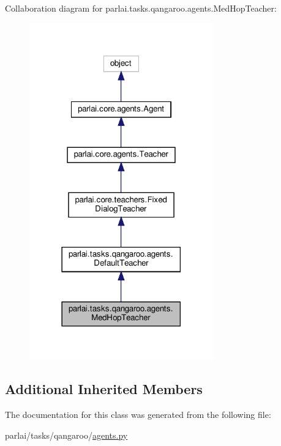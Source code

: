 Collaboration diagram for parlai.\+tasks.\+qangaroo.\+agents.\+Med\+Hop\+Teacher\+:
\nopagebreak
\begin{figure}[H]
\begin{center}
\leavevmode
\includegraphics[width=225pt]{classparlai_1_1tasks_1_1qangaroo_1_1agents_1_1MedHopTeacher__coll__graph}
\end{center}
\end{figure}
\subsection*{Additional Inherited Members}


The documentation for this class was generated from the following file\+:\begin{DoxyCompactItemize}
\item 
parlai/tasks/qangaroo/\hyperlink{parlai_2tasks_2qangaroo_2agents_8py}{agents.\+py}\end{DoxyCompactItemize}
